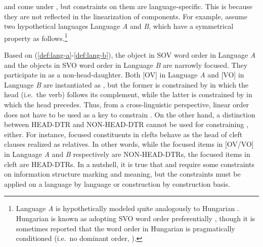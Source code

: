  and  come under , but
constraints on them are language-specific. This is
because they are not reflected in the linearization of components. For
example, assume two hypothetical languages Language \textit{A} and
\textit{B}, which have a symmetrical property as
follows.\footnote{Language \textit{A} is hypothetically modeled quite
  analogously to Hungarian \citep{kiss:98,szendroi:99}. Hungarian is
  known as adopting SVO word order preferentially
  \citep{gell:ruhlen:11}, though it is sometimes reported that the
  word order in Hungarian is pragmatically conditioned (i.e.\ no
  dominant order, \citealt{kiefer:67}).}
 





\noindent Based on (\ref{def:lang-a}-\ref{def:lang-b}), the object in
SOV word order in Language \textit{A} and the objects in SVO word
order in Language \textit{B} are narrowly focused.
They participate in  as a non-head-daughter. Both
[OV] in Language \textit{A} and [VO] in Language \textit{B} are
instantiated as , but the former is constrained
by  in which the head (i.e.\ the verb) follows its
complement, while the latter is constrained by  in
which the head precedes. Thus, from a cross-linguistic perspective,
linear order does not have to be used as a key to constrain
. On the other hand, a distinction
between HEAD-DTR and NON-HEAD-DTR cannot be used for constraining
, either.  For instance, focused constituents in
clefts behave as the head of cleft clauses realized as
relatives. In other words, while the focused items in
[OV/VO] in Language \textit{A} and \textit{B} respectively are
NON-HEAD-DTRs, the focused items in cleft are HEAD-DTRs. In
a nutshell, it is true that  and 
require some constraints on information structure marking and meaning,
but the constraints must be applied on a language by language or
construction by construction basis.


